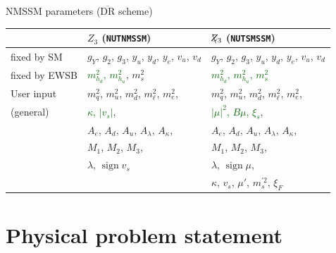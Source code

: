 \documentclass[hyperref={pdfpagelabels=false},ngerman]{beamer}
\DeclareMathOperator{\sign}{sign}
\newcommand{\DRbar}{\ensuremath{\overline{\text{DR}}}}
\newcommand{\Zv}{\ensuremath{\backslash\mkern-11.0mu{Z_3}}}
\begin{document}
\begin{frame}{NMSSM parameters ($\DRbar$ scheme)}
  \begin{table}[tbh]
    \footnotesize
    \centering
    \begin{tabularx}{\textwidth}{lXX}
      \toprule
      & $Z_3$ (\texttt{NUTNMSSM}) & $\Zv$ (\texttt{NUTSMSSM})\\
      \midrule
      fixed by SM
      & $g_Y$, $g_2$, $g_3$, $y_u$, $y_d$, $y_e$, $v_u$, $v_d$
      & $g_Y$, $g_2$, $g_3$, $y_u$, $y_d$, $y_e$, $v_u$, $v_d$
      \\\midrule
      fixed by EWSB
      & \textcolor{darkgreen}{$m_{h_d}^2$, $m_{h_u}^2$}, $m_s^2$
      & \textcolor{darkgreen}{$m_{h_d}^2$, $m_{h_u}^2$, $m_s^2$}
      \\\midrule
      User input
      & $m_q^2$, $m_u^2$,  $m_d^2$, $m_\ell^2$, $m_e^2$,
      & $m_q^2$, $m_u^2$,  $m_d^2$, $m_\ell^2$, $m_e^2$,\\
      (general)
      & \textcolor{darkgreen}{$\kappa$, $|v_s|$},
      & \textcolor{darkgreen}{$|\mu|^2$, $B\mu$, $\xi_s$},\\
      & $A_e$, $A_d$, $A_u$, $A_\lambda$, $A_\kappa$,
      & $A_e$, $A_d$, $A_u$, $A_\lambda$, $A_\kappa$,
      \\
      & $M_1$, $M_2$, $M_3$,
      & $M_1$, $M_2$, $M_3$,
      \\
      & $\lambda$, $\sign v_s$
      & $\lambda$, $\sign\mu$,
      \\
      & & $\kappa$, $v_s$, $\mu'$, $m_s^{\prime 2}$, $\xi_F$
      \\\bottomrule
    \end{tabularx}
  \end{table}
\end{frame}

\section{Physical problem statement}
\end{document}
